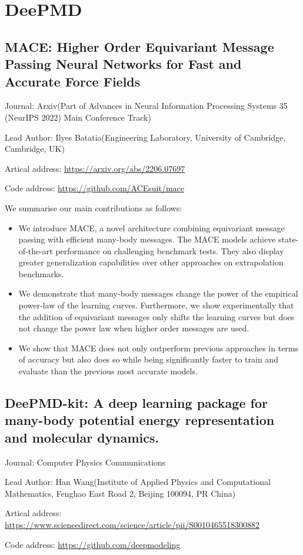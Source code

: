 \documentclass[11pt]{elegantbook}
\begin{document}
\section{DeePMD}
\subsection{MACE: Higher Order Equivariant Message Passing Neural Networks for Fast and Accurate Force Fields}
\begin{brief}
    \item Journal: Arxiv(Part of Advances in Neural Information Processing Systems 35 (NeurIPS 2022) Main Conference Track)
    \item Lead Author: Ilyes Batatia(Engineering Laboratory, University of Cambridge, Cambridge, UK)
    \item Artical address: \href{https://arxiv.org/abs/2206.07697}{https://arxiv.org/abs/2206.07697}
    \item Code address: \href{https://github.com/ACEsuit/mace}{https://github.com/ACEsuit/mace}
\end{brief}
We summarise our main contributions as follows:
\begin{itemize}
    \item We introduce MACE, a novel architecture combining equivariant message passing with efficient many-body messages. The MACE models achieve state-of-the-art performance on challenging benchmark tests. They also display greater generalization capabilities over other approaches on extrapolation benchmarks.
    \item We demonstrate that many-body messages change the power of the empirical power-law of the learning curves. Furthermore, we show experimentally that the addition of equivariant messages only shifts the learning curves but does not change the power law when higher order messages are used.
    \item We show that MACE does not only outperform previous approaches in terms of accuracy but also does so while being significantly faster to train and evaluate than the previous most accurate models.
\end{itemize}

\subsection{DeePMD-kit: A deep learning package for many-body potential energy representation and molecular dynamics.}
\begin{brief}
    \item Journal: Computer Physics Communications 
    \item Lead Author: Han Wang(Institute of Applied Physics and Computational Mathematics, Fenghao East Road 2, Beijing 100094, PR China)
    \item Artical address: \href{https://www.sciencedirect.com/science/article/pii/S0010465518300882}{https://www.sciencedirect.com/science/article/pii/S0010465518300882}
    \item Code address: \href{https://github.com/deepmodeling}{https://github.com/deepmodeling}
\end{brief}
\end{document}

